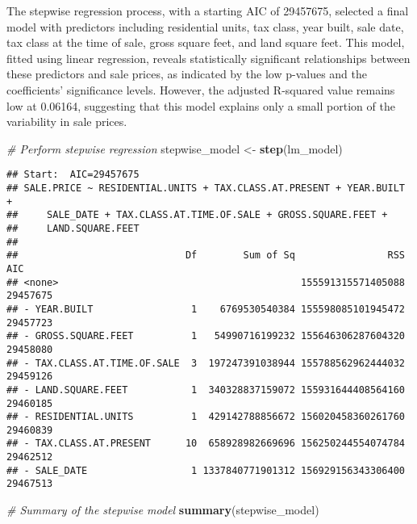 \documentclass[
]{article}
\newenvironment{Shaded}{\begin{snugshade}}{\end{snugshade}}
\newcommand{\CommentTok}[1]{\textcolor[rgb]{0.56,0.35,0.01}{\textit{#1}}}
\newcommand{\FunctionTok}[1]{\textcolor[rgb]{0.13,0.29,0.53}{\textbf{#1}}}
\newcommand{\NormalTok}[1]{#1}
\newcommand{\OtherTok}[1]{\textcolor[rgb]{0.56,0.35,0.01}{#1}}
\begin{document}
The stepwise regression process, with a starting AIC of 29457675,
selected a final model with predictors including residential units, tax
class, year built, sale date, tax class at the time of sale, gross
square feet, and land square feet. This model, fitted using linear
regression, reveals statistically significant relationships between
these predictors and sale prices, as indicated by the low p-values and
the coefficients' significance levels. However, the adjusted R-squared
value remains low at 0.06164, suggesting that this model explains only a
small portion of the variability in sale prices.

\begin{Shaded}
\begin{Highlighting}[]
\CommentTok{\# Perform stepwise regression}
\NormalTok{stepwise\_model }\OtherTok{\textless{}{-}} \FunctionTok{step}\NormalTok{(lm\_model)}
\end{Highlighting}
\end{Shaded}

\begin{verbatim}
## Start:  AIC=29457675
## SALE.PRICE ~ RESIDENTIAL.UNITS + TAX.CLASS.AT.PRESENT + YEAR.BUILT + 
##     SALE_DATE + TAX.CLASS.AT.TIME.OF.SALE + GROSS.SQUARE.FEET + 
##     LAND.SQUARE.FEET
## 
##                             Df        Sum of Sq                RSS      AIC
## <none>                                          155591315571405088 29457675
## - YEAR.BUILT                 1    6769530540384 155598085101945472 29457723
## - GROSS.SQUARE.FEET          1   54990716199232 155646306287604320 29458080
## - TAX.CLASS.AT.TIME.OF.SALE  3  197247391038944 155788562962444032 29459126
## - LAND.SQUARE.FEET           1  340328837159072 155931644408564160 29460185
## - RESIDENTIAL.UNITS          1  429142788856672 156020458360261760 29460839
## - TAX.CLASS.AT.PRESENT      10  658928982669696 156250244554074784 29462512
## - SALE_DATE                  1 1337840771901312 156929156343306400 29467513
\end{verbatim}

\begin{Shaded}
\begin{Highlighting}[]
\CommentTok{\# Summary of the stepwise model}
\FunctionTok{summary}\NormalTok{(stepwise\_model)}
\end{Highlighting}
\end{Shaded}
\end{document}
